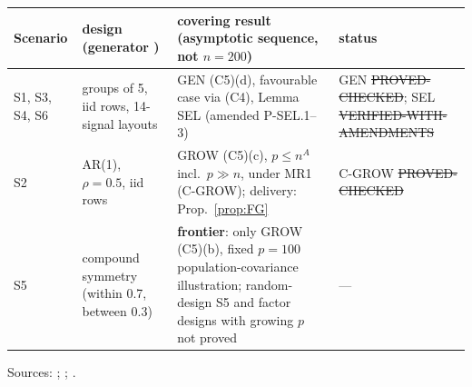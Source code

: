 {\small
\begin{xltabular}{\linewidth}{@{}p{1.2cm}p{4.3cm}Xp{2.6cm}@{}}
\toprule
Scenario & design (generator ) & covering result (asymptotic sequence, not $n=200$) & status \\
\midrule
\endhead
S1, S3, S4, S6 & groups of 5, iid rows, 14-signal layouts & GEN (C5)(d), favourable case via (C4), Lemma SEL (amended P-SEL.1--3) & GEN \st{PROVED-CHECKED}; SEL \st{VERIFIED-WITH-AMENDMENTS} \\
S2 & AR(1), $\rho=0.5$, iid rows & GROW (C5)(c), $p\le n^A$ incl.\ $p\gg n$, under MR1 (C-GROW); delivery: Prop.~\ref{prop:FG} & C-GROW \st{PROVED-CHECKED} \\
S5 & compound symmetry (within 0.7, between 0.3) & \textbf{frontier}: only GROW (C5)(b), fixed $p=100$ population-covariance illustration; random-design S5 and factor designs with growing $p$ not proved & — \\
\bottomrule
\end{xltabular}
}
\noindent Sources: ; ; .
